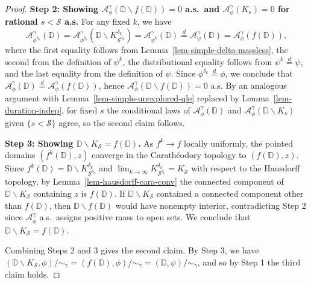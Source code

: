 \documentclass[10pt,a4paper]{amsart}
\newcommand{\D}{\mathbb{D}}
\newcommand{\cA}{\mathcal{A}}
\newcommand{\qduration}{\mathcal{S}}
\begin{document}
\begin{proof}
\medskip 
\noindent 
\textbf{Step 2: Showing $\cA^\gamma_\phi(\D \backslash f(\D)) = 0$ a.s.\ and $\cA^\gamma_\phi(K_s) = 0$ for rational $s < \qduration$ a.s.} For any fixed $k$, we have
    \[\cA^\gamma_{\phi^{\delta_k}}(\D) = \cA^\gamma_{\phi^{\delta_k}}(\D \backslash K^{\delta_k}_{\qduration^{\delta_k}}) = \cA^\gamma_{\psi^k}(\D) \stackrel d= \cA^\gamma_\psi(\D) = \cA^\gamma_{\phi}(f(\D)),\]
    where the first equality follows from Lemma~\ref{lem-simple-delta-massless}, the second from the definition of $\psi^k$, the distributional equality follows from $\psi^k \stackrel d= \psi$, and the last equality from the definition of $\psi$. Since $\phi^{\delta_k} \stackrel d= \phi$, we conclude that $\cA^\gamma_\phi(\D) \stackrel d= \cA^\gamma_\phi(f(\D))$, hence $\cA^\gamma_\phi(\D \backslash f(\D)) = 0$ a.s. By an analogous argument with Lemma~\ref{lem-simple-unexplored-qle} replaced by Lemma~\ref{lem-duration-indep}, for fixed $s$ the conditional laws of $\cA_\phi^\gamma(\D)$ and $\cA_\phi^\gamma (\D \backslash K_s)$ given $\{ s < \qduration\}$ agree, so the second claim follows. 

\medskip 
\noindent \textbf{Step 3: Showing $\D \backslash K_\qduration = f(\D)$.}
    As $f^k \to f$ locally uniformly, %
    the pointed domains $(f^k(\D), z)$ converge in the Carath\'eodory topology to $(f(\D), z)$. Since $f^k(\D) = \D \backslash K_{\qduration^{\delta_k}}^{\delta_k}$ and $\lim_{k \to \infty} K_{\qduration^{\delta_k}}^{\delta_k} = K_\qduration$ with respect to the Hausdorff topology, by Lemma~\ref{lem-hausdorff-cara-conv} the connected component of $\D \backslash K_\qduration$ containing $z$ is $f(\D)$. 
    If $\D \backslash K_\qduration$ contained a connected component other than $f(\D)$, then $\D \backslash f(\D)$ would have nonempty interior, contradicting Step 2 since $\cA^\gamma_\phi$ a.s.\ assigns positive mass to open sets. We conclude that $\D \backslash K_\qduration = f(\D)$. 

 
    Combining Steps 2 and 3 gives the second claim. By Step 3, we have $(\D \backslash K_\qduration, \phi)/{\sim_\gamma} = (f(\D), \phi)/{\sim_\gamma} = (\D, \psi)/{\sim_\gamma}$, and so by Step 1 the third claim holds.


\end{proof}
\end{document}
